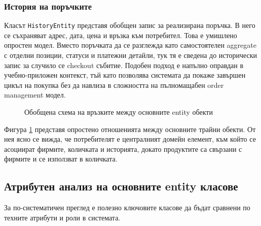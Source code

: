 \subsubsection{История на поръчките}

Класът \texttt{HistoryEntity} представя обобщен запис за реализирана поръчка. В него се съхраняват адрес, дата, цена и връзка към потребител. Това е умишлено опростен модел. Вместо поръчката да се разглежда като самостоятелен aggregate с отделни позиции, статуси и платежни детайли, тук тя е сведена до исторически запис за случило се checkout събитие. Подобен подход е напълно оправдан в учебно-приложен контекст, тъй като позволява системата да покаже завършен цикъл на покупка без да навлиза в сложността на пълномащабен order management модел.

\begin{figure}[H]
    \centering
    \caption{Обобщена схема на връзките между основните entity обекти}
    \label{fig:entity-relationships}
\end{figure}

Фигура \ref{fig:entity-relationships} представя опростено отношенията между основните трайни обекти. От нея ясно се вижда, че потребителят е централният домейн елемент, към който се асоциират фирмите, количката и историята, докато продуктите са свързани с фирмите и се използват в количката.

\subsection{Атрибутен анализ на основните entity класове}

За по-систематичен преглед е полезно ключовите класове да бъдат сравнени по техните атрибути и роли в системата.


